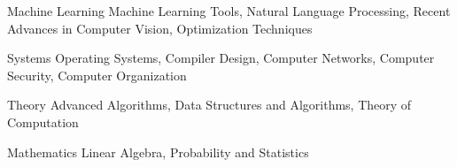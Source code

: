 

\begin{cvskills}

  \cvskill
    {Machine Learning} %
    {Machine Learning Tools,  Natural Language Processing, Recent Advances in Computer Vision, Optimization Techniques} %

  \cvskill
    {Systems} %
    {Operating Systems, Compiler Design, Computer Networks, Computer Security, Computer Organization} %

  \cvskill
    {Theory} %
    {Advanced Algorithms, Data Structures and Algorithms, Theory of Computation} %
	
	\cvskill
		{Mathematics}
		{Linear Algebra, Probability and Statistics}
\end{cvskills}
